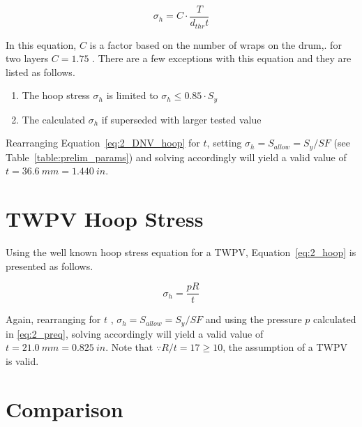 \begin{equation}
	\label{eq:2_DNV_hoop}
	\sigma_h = C\cdot\frac{T}{d_{thr}t}
\end{equation}

In this equation, $C$ is a factor based on the number of wraps on the drum,. for two layers $C=1.75$ \citep{DNVOSD101}. There are a few exceptions with this equation and they are listed as follows.

\begin{enumerate}
	\item The hoop stress $\sigma_h$ is limited to $\sigma_h \leq 0.85\cdot S_y$
	\item The calculated $\sigma_h$  if superseded with larger tested value\\
\end{enumerate}

Rearranging Equation~\ref{eq:2_DNV_hoop} for $t$, setting $\sigma_h = S_{allow}=S_y/SF$ (see Table~\ref{table:prelim_params}) and solving accordingly will yield a valid value of $t = 36.6\ mm = 1.440 \ in$. 

\section{TWPV Hoop Stress}

Using the well known hoop stress equation \citep{roarks} for a TWPV, Equation~\ref{eq:2_hoop} is presented as follows.

\begin{equation}
	\label{eq:2_hoop}
	\sigma_h = \frac{pR}{t}
\end{equation}

Again, rearranging for $t$ , $\sigma_h = S_{allow}=S_y/SF$ and using the pressure $p$ calculated in \ref{eq:2_preq}, solving accordingly will yield a valid value of $t = 21.0\ mm = 0.825 \ in$. Note that $\because R/t = 17 \geq 10$, the assumption of a TWPV is valid.

\section{Comparison}

